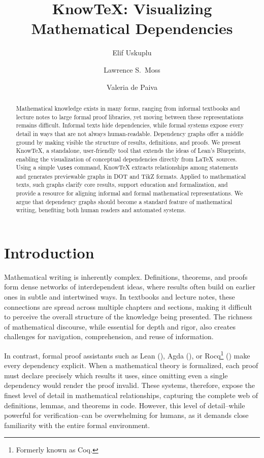 \documentclass{article}
\title{KnowTeX: Visualizing Mathematical Dependencies}
\author{Elif Uskuplu \and Lawrence S.~Moss \and Valeria de Paiva}
\begin{document}
\maketitle

\begin{abstract}
Mathematical knowledge exists in many forms, ranging from informal textbooks and lecture notes to large formal proof
libraries, yet moving between these representations remains difficult. Informal texts hide dependencies, while formal
systems expose every detail in ways that are not always human-readable. Dependency graphs offer a middle ground
by making visible the structure of results, definitions, and proofs. We present KnowTeX, a standalone, user-friendly tool that extends the ideas of Lean’s Blueprints, enabling the visualization of conceptual dependencies directly from
\LaTeX\ sources. Using a simple {\verb|\uses|} command, KnowTeX extracts relationships among statements and generates
previewable graphs in DOT and TikZ formats. Applied to mathematical texts, such graphs clarify core results, support
education and formalization, and provide a resource for aligning informal and formal mathematical representations.
We argue that dependency graphs should become a standard feature of mathematical writing, benefiting both human
readers and automated systems.
\end{abstract}

\section{Introduction}

Mathematical writing is inherently complex. Definitions, theorems, and proofs form dense networks of interdependent ideas, where results often build on earlier ones in subtle and intertwined ways. In textbooks and lecture notes, these connections are spread across multiple chapters and sections, making it difficult to perceive the overall structure of the knowledge being presented. 
The richness of mathematical discourse, while essential for depth and rigor, also creates challenges for navigation, comprehension, and reuse of information.

In contrast, formal proof assistants such as Lean (\cite{demoura2015}), Agda (\cite{norell2009}), or Rocq\footnote{Formerly known as Coq.} (\cite{bertot2010}) make every dependency explicit. When a mathematical theory is formalized, each proof must declare precisely which results it uses, since omitting even a single dependency would render the proof invalid. These systems, therefore, expose the finest level of detail in mathematical relationships, capturing the complete web of definitions, lemmas, and theorems in code.
However, this level of detail--while powerful for verification--can be overwhelming for humans, as it demands close familiarity with the entire formal environment.
\end{document}
